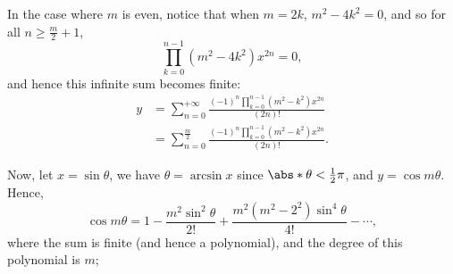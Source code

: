 In the case where \(m\) is even, notice that when \(m = 2k\), \(m^2 - 4k^2 = 0\), and so for all \(n \geq \frac{m}{2} + 1\),
\[
    \prod_{k = 0}^{n - 1} (m^2 - 4k^2) x^{2n} = 0,
\]
and hence this infinite sum becomes finite:
\begin{align*}
    y & = \sum_{n = 0}^{+\infty} \frac{(-1)^n \prod_{k = 0}^{n - 1} (m^2 - k^2) x^{2n}}{(2n)!}      \\
      & = \sum_{n = 0}^{\frac{m}{2}} \frac{(-1)^n \prod_{k = 0}^{n - 1} (m^2 - k^2) x^{2n}}{(2n)!}.
\end{align*}

Now, let \(x = \sin \theta\), we have \(\theta = \arcsin x\) since \(\abs*{\theta} < \frac{1}{2}\pi\), and \(y = \cos m\theta\). Hence,
\[
    \cos m\theta = 1 - \frac{m^2 \sin^2\theta}{2!} + \frac{m^2 (m^2 - 2^2) \sin^4\theta}{4!} - \cdots,
\]
where the sum is finite (and hence a polynomial), and the degree of this polynomial is \(m\);